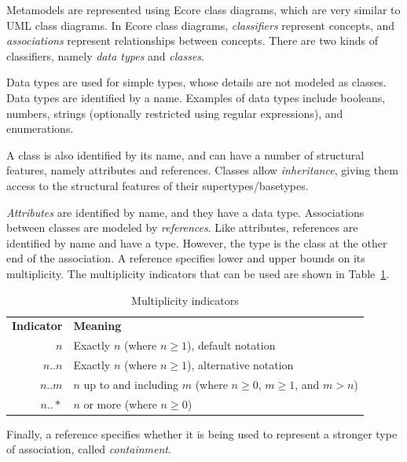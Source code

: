 
Metamodels are represented using Ecore class diagrams, which are very similar
to UML class diagrams. In Ecore class diagrams,
\emph{classifiers} represent concepts, and \emph{associations} represent
relationships between concepts. There are two kinds of classifiers, namely
\emph{data types} and \emph{classes}.

Data types are used for simple types, whose details are not modeled as classes.
Data types are identified by a name. Examples of data types include booleans,
numbers, strings (optionally restricted using regular expressions), and
enumerations.

A class is also identified by its name, and can have a number of structural
features, namely attributes and references. Classes allow \emph{inheritance},
giving them access to the structural features of their supertypes/basetypes.

\emph{Attributes} are identified by name, and they have a data type.
Associations between classes are modeled by \emph{references}. Like attributes,
references are identified by name and have a type. However, the type is the
class at the other end of the association. A reference specifies lower and
upper bounds on its multiplicity. The multiplicity indicators that can be used
are shown in Table~\ref{tbl:multiplicity}.
\begin{table}
\caption{Multiplicity indicators}\label{tbl:multiplicity}
\begin{center}
\begin{tabular}[htb]{@{}|r|@{\quad} l |}
    \hline
    \textbf{Indicator} & \textbf{Meaning} \\
    $n$    & Exactly $n$ (where $n\ge 1$), default notation \\
    $n..n$ & Exactly $n$ (where $n\ge 1$), alternative notation \\
    $n..m$ & $n$ up to and including $m$
             (where $n\ge 0$, $m\ge 1$, and $m>n$) \\
    $n..*$ & $n$ or more (where $n\ge 0$) \\
    \hline
\end{tabular}
\end{center}
\end{table}
Finally, a reference specifies whether it is being used to represent a
stronger type of association, called \emph{containment}.

